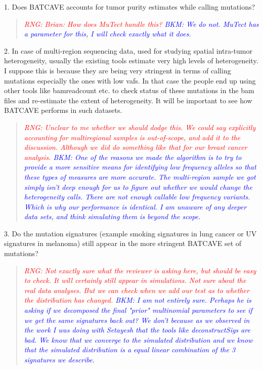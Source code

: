 \documentclass[11pt]{article}
\newcommand{\BKM}[1]{\textcolor{blue}{BKM: #1}}
\newcommand{\RNG}[1]{\textcolor{red}{RNG: #1}}
\newenvironment{response}
{\begin{quote}\itshape}
{\end{quote}}
\begin{document}
1. Does BATCAVE accounts for tumor purity estimates while calling mutations?
\begin{response}
\RNG{Brian: How does MuTect handle this?}
\BKM{We do not. MuTect has a parameter for this, I will check exactly what it does.}
\end{response}

2. In case of multi-region sequencing data, used for studying spatial intra-tumor heterogeneity, usually the existing tools estimate very high levels of heterogeneity. I suppose this is because they are being very stringent in terms of calling mutations especially the ones with low vafs. In that case the people end up using other tools like bamreadcount etc. to check status of these mutations in the bam files and re-estimate the extent of heterogeneity. It will be important to see how BATCAVE performs in such datasets.
\begin{response}
\RNG{Unclear to me whether we should dodge this. We could say explicitly accounting for multiregional samples is out-of-scope, and add it to the discussion. Although we did do something like that for our breast cancer analysis.}
\BKM{One of the reasons we made the algorithm is to try to provide a more sensitive means for identifying low frequency alleles so that these types of measures are more accurate. The multi-region sample we got simply isn't deep enough for us to figure out whether we would change the heterogeneity calls. There are not enough callable low frequency variants. Which is why our performance is identical. I am unaware of any deeper data sets, and think simulating them is beyond the scope.}
\end{response}

3. Do the mutation signatures (example smoking signatures in lung cancer or UV signatures in melanoma) still appear in the more stringent BATCAVE set of mutations?
\begin{response}
\RNG{Not exactly sure what the reviewer is asking here, but should be easy to check. It will certainly still appear in simulations. Not sure about the real data analyses. But we can check when we add our test as to whether the distribution has changed.}
\BKM{I am not entirely sure. Perhaps he is asking if we decomposed the final "prior" multinomial parameters to see if we get the same signatures back out? We don't because as we observed in the work I was doing with Setayesh that the tools like deconstructSigs are bad. We know that we converge to the simulated distribution and we know that the simulated distribution is a equal linear combination of the 3 signatures we describe.}
\end{response}
\end{document}
